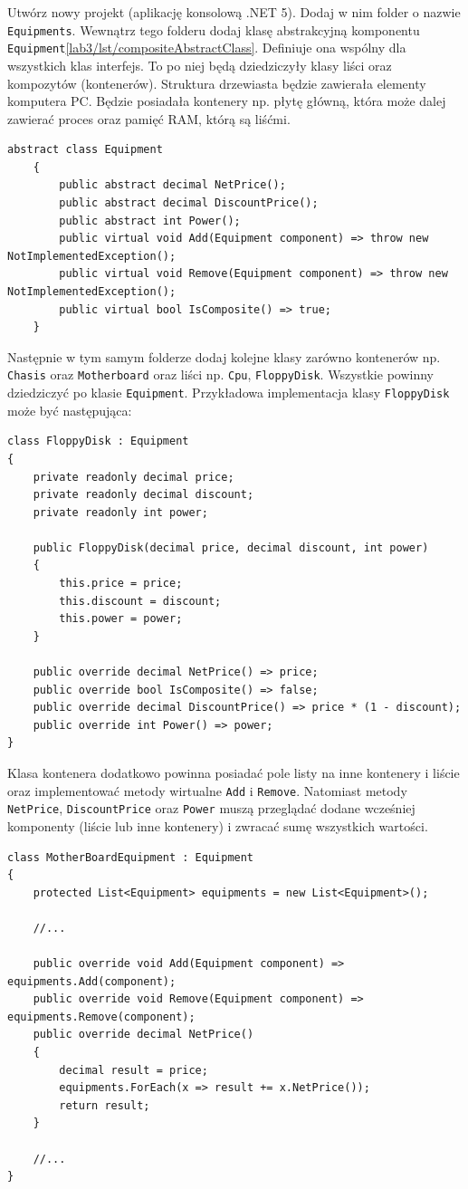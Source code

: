 Utwórz nowy projekt (aplikację konsolową .NET 5). Dodaj w nim folder o nazwie \texttt{Equipments}. Wewnątrz tego folderu dodaj klasę abstrakcyjną komponentu \texttt{Equipment}\ref{lab3/lst/compositeAbstractClass}. Definiuje ona wspólny dla wszystkich klas interfejs. To po niej będą dziedziczyły klasy liści oraz kompozytów (kontenerów). Struktura drzewiasta będzie zawierała elementy komputera PC. Będzie posiadała kontenery np. płytę główną, która może dalej zawierać proces oraz pamięć RAM, którą są liśćmi.
\begin{lstlisting}[caption={Przykład abstrakcyjnej klasy komponentu}, label={lab3/lst/compositeAbstractClass}]
	abstract class Equipment
	{
		public abstract decimal NetPrice();
		public abstract decimal DiscountPrice();	
		public abstract int Power();
		public virtual void Add(Equipment component) => throw new NotImplementedException();	
		public virtual void Remove(Equipment component) => throw new NotImplementedException();
		public virtual bool IsComposite() => true;
	}
\end{lstlisting}
Następnie w tym samym folderze dodaj kolejne klasy zarówno kontenerów np. \texttt{Chasis} oraz \texttt{Motherboard} oraz liści np. \texttt{Cpu}, \texttt{FloppyDisk}. Wszystkie powinny dziedziczyć po klasie \texttt{Equipment}. Przykładowa implementacja klasy \texttt{FloppyDisk} może być następująca:
\begin{lstlisting}[caption={Przykład klasy będącej liściem kompozytu}, label={lab3/lst/compositeLeafFloppyDisk}]
class FloppyDisk : Equipment
{
	private readonly decimal price;
	private readonly decimal discount;
	private readonly int power;
	
	public FloppyDisk(decimal price, decimal discount, int power)
	{
		this.price = price;
		this.discount = discount;
		this.power = power;
	}

	public override decimal NetPrice() => price;	
	public override bool IsComposite() => false;	
	public override decimal DiscountPrice() => price * (1 - discount);
	public override int Power() => power;
}
\end{lstlisting}
Klasa kontenera dodatkowo powinna posiadać pole listy na inne kontenery i liście oraz implementować metody wirtualne \texttt{Add} i \texttt{Remove}. Natomiast metody \texttt{NetPrice}, \texttt{DiscountPrice} oraz \texttt{Power} muszą przeglądać dodane wcześniej komponenty (liście lub inne kontenery) i zwracać sumę wszystkich wartości.
\begin{lstlisting}
class MotherBoardEquipment : Equipment
{
	protected List<Equipment> equipments = new List<Equipment>();

	//...
		
	public override void Add(Equipment component) => equipments.Add(component);	
	public override void Remove(Equipment component) => equipments.Remove(component);
	public override decimal NetPrice()
	{
		decimal result = price;
		equipments.ForEach(x => result += x.NetPrice());	
		return result;
	}
		
	//...
}
\end{lstlisting}

